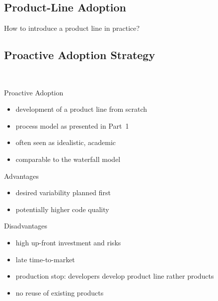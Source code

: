 \subsection{Product-Line Adoption}
\begin{frame}{\myframetitle}
	\Huge\centering How to introduce a product line in practice?
\end{frame}

\subsection{Proactive Adoption Strategy}
\begin{frame}{\myframetitle\ }
	\begin{mycolumns}[animation=none]
		\begin{definition}{Proactive Adoption}
			\begin{itemize}
				\item development of a product line from scratch
				\item process model as presented in Part~1
				\item often seen as idealistic, academic
				\item comparable to the waterfall model
			\end{itemize}
		\end{definition}
	\mynextcolumn
		\begin{note}{Advantages}
			\begin{itemize}
				\item desired variability planned first
				\item potentially higher code quality
			\end{itemize}
		\end{note}
		\begin{note}{Disadvantages}
			\begin{itemize}
				\item high up-front investment and risks
				\item late time-to-market
				\item production stop: developers develop product line rather products
				\item no reuse of existing products
			\end{itemize}
		\end{note}
	\end{mycolumns}
\end{frame}

